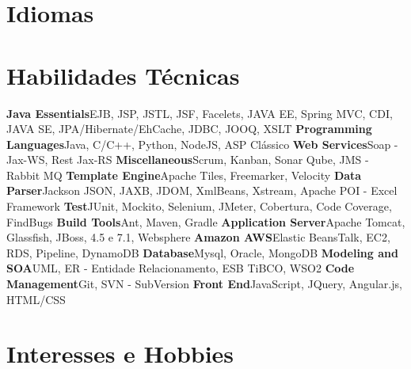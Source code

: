 \documentclass[11pt,a4paper]{moderncv}
\begin{document}
\section{Idiomas}


\section{Habilidades Técnicas}
\cvcomputer
{\textbf{Java Essentials}}{EJB, JSP, JSTL, JSF, Facelets, JAVA EE, Spring MVC, CDI, JAVA SE, JPA/Hibernate/EhCache, JDBC, JOOQ, XSLT}
{\textbf{Programming Languages}}{Java, C/C++, Python, NodeJS, ASP Clássico}
\cvcomputer
{\textbf{Web Services}}{Soap - Jax-WS, Rest Jax-RS}
{\textbf{Miscellaneous}}{Scrum, Kanban, Sonar Qube, JMS - Rabbit MQ}
\cvcomputer
{\textbf{Template Engine}}{Apache Tiles, Freemarker, Velocity}
{\textbf{Data Parser}}{Jackson JSON, JAXB, JDOM, XmlBeans, Xstream, Apache POI - Excel Framework}
\cvcomputer
{\textbf{Test}}{JUnit, Mockito, Selenium, JMeter, Cobertura, Code Coverage, FindBugs}
{\textbf{Build Tools}}{Ant, Maven, Gradle}
\cvcomputer
{\textbf{Application Server}}{Apache Tomcat, Glassfish, JBoss, 4.5 e 7.1, Websphere}
{\textbf{Amazon AWS}}{Elastic BeansTalk, EC2, RDS, Pipeline, DynamoDB}
\cvcomputer
{\textbf{Database}}{Mysql, Oracle, MongoDB}
{\textbf{Modeling and SOA}}{UML, ER - Entidade Relacionamento, ESB TiBCO, WSO2}
\cvcomputer
{\textbf{Code Management}}{Git, SVN - SubVersion}
{\textbf{Front End}}{JavaScript, JQuery, Angular.js, HTML/CSS}
{}{}

\section{Interesses e Hobbies}

\end{document}
